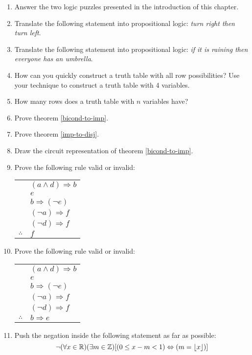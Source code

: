 \documentclass[main.tex]{subfiles}
\begin{document}
\begin{enumerate}
	\item Answer the two logic puzzles presented in the introduction of this chapter.
	\item Translate the following statement into propositional logic: \textit{turn right then turn left}.
	\item Translate the following statement into propositional logic: \textit{if it is raining then everyone has an umbrella}.
	\item How can you quickly construct a truth table with all row possibilities? Use your technique to construct a truth table with 4 variables.
	\item How many rows does a truth table with \(n\) variables have?
	\item Prove theorem \ref{bicond-to-imp}.
	\item Prove theorem \ref{imp-to-disj}.
	\item Draw the circuit representation of theorem \ref{bicond-to-imp}.
	\item Prove the following rule valid or invalid:
	\begin{center}
		\begin{tabular}{c@{\,}l@{}}
			& \((a \land d) \Rightarrow b\) \\
			& \(e\) \\
			& \(b \Rightarrow (\lnot e)\) \\
			& \((\lnot a) \Rightarrow f\) \\
			& \((\lnot d) \Rightarrow f\) \\
			\cline{2-2}
			\(\therefore\) & \(f\)
		\end{tabular}
	\end{center}
	\item Prove the following rule valid or invalid:
	\begin{center}
		\begin{tabular}{c@{\,}l@{}}
			& \((a \land d) \Rightarrow b\) \\
			& \(e\) \\
			& \(b \Rightarrow (\lnot e)\) \\
			& \((\lnot a) \Rightarrow f\) \\
			& \((\lnot d) \Rightarrow f\) \\
			\cline{2-2}
			\(\therefore\) & \(b \Rightarrow e\)
		\end{tabular}
	\end{center}
	\item Push the negation inside the following statement as far as possible: \[\lnot (\forall x \in \mathbb{R})(\exists m \in \mathbb{Z})[(0 \leq x - m < 1) \Leftrightarrow (m = \lfloor x\rfloor)]\]
\end{enumerate}
\end{document}

